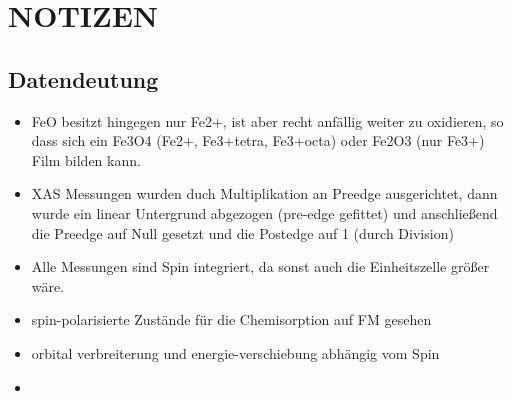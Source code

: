   
    \section{NOTIZEN}
    \subsection{Datendeutung}
        \begin{itemize}
            \item FeO besitzt hingegen nur Fe2+, ist aber recht anfällig weiter zu oxidieren, so dass sich ein Fe3O4 (Fe2+, Fe3+tetra, Fe3+octa) oder Fe2O3 (nur Fe3+) Film bilden kann. 
            \item XAS Messungen wurden duch Multiplikation an Preedge ausgerichtet, dann wurde ein linear Untergrund abgezogen (pre-edge gefittet) und anschließend die Preedge auf Null gesetzt und die Postedge auf 1 (durch Division)
            \item Alle Messungen sind Spin integriert, da sonst auch die Einheitszelle größer wäre.
            \item spin-polarisierte Zustände für die Chemisorption auf FM gesehen \cite{IF_16}
            \item orbital verbreiterung und energie-verschiebung abhängig vom Spin \cite{IF_16}
            \item 
        \end{itemize}


